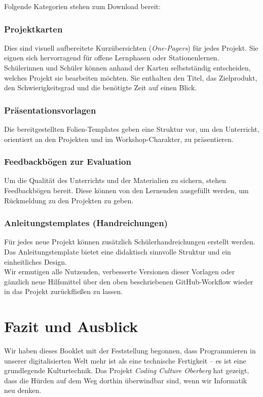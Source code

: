 \documentclass[a5paper,pagesize,10pt,bibtotoc,pointlessnumbers,
normalheadings,DIV=9,twoside=false]{scrbook}
\begin{document}
Folgende Kategorien stehen zum Download bereit:

\subsection{Projektkarten}
Dies sind visuell aufbereitete Kurzübersichten (\textit{One-Pagers}) für jedes Projekt. Sie eignen sich hervorragend für offene Lernphasen oder Stationenlernen. Schülerinnen und Schüler können anhand der Karten selbstständig entscheiden, welches Projekt sie bearbeiten möchten. Sie enthalten den Titel, das Zielprodukt, den Schwierigkeitsgrad und die benötigte Zeit auf einen Blick.

\subsection{Präsentationsvorlagen}
Die bereitgestellten Folien-Templates geben eine Struktur vor, um den Unterricht, orientiert an den Projekten und im Workshop-Charakter, zu präsentieren.

\subsection{Feedbackbögen zur Evaluation}
Um die Qualität des Unterrichts und der Materialien zu sichern, stehen Feedbackbögen bereit. Diese können von den Lernenden ausgefüllt werden, um Rückmeldung zu den Projekten zu geben.

\subsection{Anleitungstemplates (Handreichungen)}
Für jedes neue Projekt können zusätzlich Schülerhandreichungen erstellt werden. Das Anleitungstemplate bietet eine didaktisch sinnvolle Struktur und ein einheitliches Design.
\\

Wir ermutigen alle Nutzenden, verbesserte Versionen dieser Vorlagen oder gänzlich neue Hilfsmittel über den oben beschriebenen GitHub-Workflow wieder in das Projekt zurückfließen zu lassen.

\chapter{Fazit und Ausblick}

Wir haben dieses Booklet mit der Feststellung begonnen, dass Programmieren in unserer digitalisierten Welt mehr ist als eine technische Fertigkeit -- es ist eine grundlegende Kulturtechnik. Das Projekt \textit{Coding Culture Oberberg} hat gezeigt, dass die Hürden auf dem Weg dorthin überwindbar sind, wenn wir Informatik neu denken.
\end{document}

